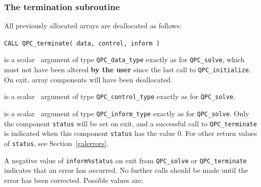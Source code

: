 \documentclass{galahad}
\newcommand{\packagename}{QPC}
\begin{document}

\subsubsection{The  termination subroutine}
All previously allocated arrays are deallocated as follows:
\vspace*{1mm}

\hspace{8mm}
{\tt CALL \packagename\_terminate( data, control, inform )}

\vspace*{-3mm}
\begin{description}

 is a scalar \intentinout\ argument of type 
{\tt \packagename\_data\_type} 
exactly as for
{\tt \packagename\_solve},
which must not have been altered {\bf by the user} since the last call to 
{\tt \packagename\_initialize}.
On exit, array components will have been deallocated.

 is a scalar \intentin\ argument of type 
{\tt \packagename\_control\_type}
exactly as for
{\tt \packagename\_solve}.

 is a scalar \intentout\ argument of type
{\tt \packagename\_inform\_type}
exactly as for
{\tt \packagename\_solve}.
Only the component {\tt status} will be set on exit, and a 
successful call to 
{\tt \packagename\_terminate}
is indicated when this  component {\tt status} has the value 0. 
For other return values of {\tt status}, see Section~\ref{galerrors}.

\end{description}


\galerrors
A negative value of {\tt inform\%status} on exit from 
{\tt \packagename\_solve}
or 
{\tt \packagename\_terminate}
indicates that an error has occurred. No further calls should be made
until the error has been corrected. Possible values are:
\end{document}

